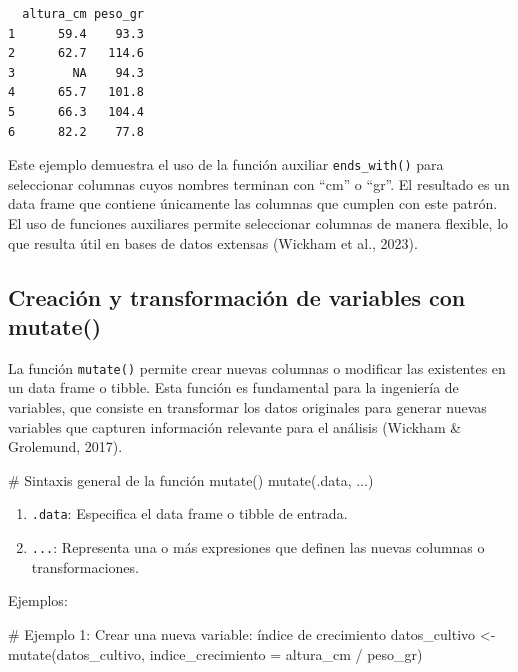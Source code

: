 \documentclass[
  spanish,
  a4paper,
  DIV=11,
  numbers=noendperiod,
  onepage,
  openany]{scrreprt}
\newenvironment{Shaded}{\begin{snugshade}}{\end{snugshade}}
\newcommand{\AttributeTok}[1]{\textcolor[rgb]{0.40,0.45,0.13}{#1}}
\newcommand{\CommentTok}[1]{\textcolor[rgb]{0.37,0.37,0.37}{#1}}
\newcommand{\FunctionTok}[1]{\textcolor[rgb]{0.28,0.35,0.67}{#1}}
\newcommand{\NormalTok}[1]{\textcolor[rgb]{0.00,0.23,0.31}{#1}}
\newcommand{\OtherTok}[1]{\textcolor[rgb]{0.00,0.23,0.31}{#1}}
\newcommand{\SpecialCharTok}[1]{\textcolor[rgb]{0.37,0.37,0.37}{#1}}
\begin{document}
\begin{verbatim}
  altura_cm peso_gr
1      59.4    93.3
2      62.7   114.6
3        NA    94.3
4      65.7   101.8
5      66.3   104.4
6      82.2    77.8
\end{verbatim}

Este ejemplo demuestra el uso de la función auxiliar
\texttt{ends\_with()} para seleccionar columnas cuyos nombres terminan
con ``cm'' o ``gr''. El resultado es un data frame que contiene
únicamente las columnas que cumplen con este patrón. El uso de funciones
auxiliares permite seleccionar columnas de manera flexible, lo que
resulta útil en bases de datos extensas (Wickham et al., 2023).

\subsection{Creación y transformación de variables con
mutate()}\label{creaciuxf3n-y-transformaciuxf3n-de-variables-con-mutate}

La función \texttt{mutate()} permite crear nuevas columnas o modificar
las existentes en un data frame o tibble. Esta función es fundamental
para la ingeniería de variables, que consiste en transformar los datos
originales para generar nuevas variables que capturen información
relevante para el análisis (Wickham \& Grolemund, 2017).

\begin{Shaded}
\begin{Highlighting}[]
\CommentTok{\# Sintaxis general de la función mutate()}
\FunctionTok{mutate}\NormalTok{(.data, ...)}
\end{Highlighting}
\end{Shaded}

\begin{enumerate}
\def\labelenumi{\arabic{enumi}.}
\item
  \texttt{.data}: Especifica el data frame o tibble de entrada.
\item
  \texttt{...}: Representa una o más expresiones que definen las nuevas
  columnas o transformaciones.
\end{enumerate}

Ejemplos:

\begin{Shaded}
\begin{Highlighting}[]
\CommentTok{\# Ejemplo 1: Crear una nueva variable: índice de crecimiento}
\NormalTok{datos\_cultivo }\OtherTok{\textless{}{-}} \FunctionTok{mutate}\NormalTok{(datos\_cultivo,}
                       \AttributeTok{indice\_crecimiento =} 
\NormalTok{                         altura\_cm }\SpecialCharTok{/}\NormalTok{ peso\_gr)}
\end{Highlighting}
\end{Shaded}
\end{document}
